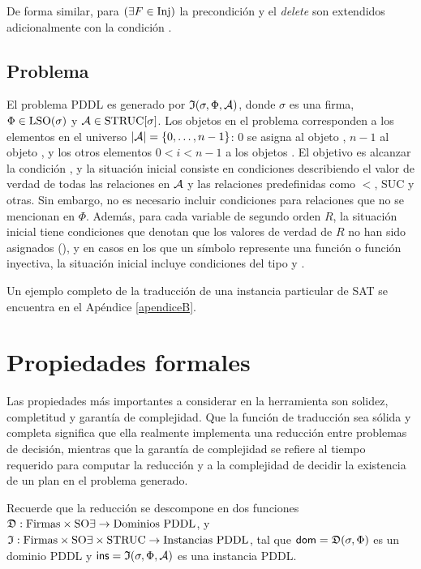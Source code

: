 De forma similar, para $(\exists F\in\text{Inj})$ la precondición y el
\textit{delete}
son extendidos adicionalmente con la condición .

\subsection{Problema}

\label{traduccionproblema}
El problema PDDL es generado por $\mathfrak{I}(\sigma,\Phi,\mathcal{A})$, donde
$\sigma$ es una firma, $\Phi\in\text{LSO}(\sigma)$ y $\mathcal{A}\in\text{STRUC}[\sigma]$.
Los objetos en el problema corresponden a los elementos en el universo
$|\mathcal{A}|=\{0,\ldots,n-1\}$: $0$ se asigna al objeto
, $n-1$ al objeto , y los otros elementos
$0<i<n-1$ a los objetos .
El objetivo es alcanzar la condición , y la situación
inicial consiste en condiciones describiendo el valor de verdad de todas las
relaciones en $\mathcal{A}$ y las relaciones predefinidas como $<$, SUC y otras. Sin
embargo, no es necesario incluir condiciones para relaciones que no se
mencionan en $\Phi$. Además, para cada variable de segundo orden $R$, la
situación inicial tiene condiciones que denotan que los valores de verdad de
$R$ no han sido asignados (), y en casos en los que un símbolo
represente una función o función inyectiva, la situación inicial incluye
condiciones del tipo  y .

Un ejemplo completo de la traducción de una instancia particular de SAT se
encuentra en el Apéndice \ref{apendiceB}.

\section{Propiedades formales}
Las propiedades más importantes a considerar en la herramienta son solidez,
completitud y garantía de complejidad. Que la función de traducción sea sólida
y completa significa que ella realmente implementa una reducción entre problemas de
decisión, mientras que la garantía de complejidad se refiere al tiempo
requerido para computar la reducción y a la complejidad de decidir la existencia
de un plan en el problema generado.

Recuerde que la reducción se descompone en dos funciones $\mathfrak{D} :
\text{Firmas} \times \text{SO}\exists \rightarrow \text{Dominios PDDL}$, y $\mathfrak{I} :
\text{Firmas} \times \text{SO}\exists \times \text{STRUC} \rightarrow \text{Instancias PDDL}$,
tal que $\mathsf{dom}=\mathfrak{D}(\sigma,\Phi)$ es un dominio PDDL
y $\mathsf{ins}=\mathfrak{I}(\sigma,\Phi,\mathcal{A})$ es una instancia PDDL.


